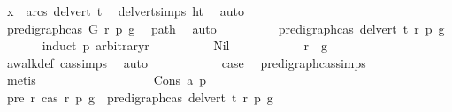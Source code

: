 \begin{isabellebody}
\ {\isachardoublequoteopen}x\ {\isasymin}\ arcs\ {\isacharparenleft}{\kern0pt}del{\isacharunderscore}{\kern0pt}vert\ t{\isacharparenright}{\kern0pt}{\isachardoublequoteclose}\ \isamarkupfalse%
\ del{\isacharunderscore}{\kern0pt}vert{\isacharunderscore}{\kern0pt}simps{\isacharparenleft}{\kern0pt}{}{\isacharparenright}{\kern0pt}\ ht\ \isamarkupfalse%
\ auto\ \ \ \isanewline
\ \ \ \ \isamarkupfalse%
\isanewline
\ \ \ \ \ \ \isamarkupfalse%
\ {\isachardoublequoteopen}pre{\isacharunderscore}{\kern0pt}digraph{\isachardot}{\kern0pt}cas\ G\ r\ p\ g{\isachardoublequoteclose}\ \isamarkupfalse%
\ path\ \isamarkupfalse%
\ auto\isanewline
\ \ \ \ \ \ \isamarkupfalse%
\ \isamarkupfalse%
\ {\isachardoublequoteopen}pre{\isacharunderscore}{\kern0pt}digraph{\isachardot}{\kern0pt}cas\ {\isacharparenleft}{\kern0pt}del{\isacharunderscore}{\kern0pt}vert\ t{\isacharparenright}{\kern0pt}\ r\ p\ g{\isachardoublequoteclose}\isanewline
\ \ \ \ \ \ \isamarkupfalse%
{\isacharparenleft}{\kern0pt}induct\ p\ arbitrary{\isacharcolon}{\kern0pt}r{\isacharparenright}{\kern0pt}\isanewline
\ \ \ \ \ \ \ \ \isamarkupfalse%
\ Nil\isanewline
\ \ \ \ \ \ \ \ \isamarkupfalse%
\ \isamarkupfalse%
\ {\isachardoublequoteopen}r\ {\isacharequal}{\kern0pt}\ g{\isachardoublequoteclose}\ \isamarkupfalse%
\ awalk{\isacharunderscore}{\kern0pt}def\ cas{\isachardot}{\kern0pt}simps\ \isamarkupfalse%
\ auto\isanewline
\ \ \ \ \ \ \ \ \isamarkupfalse%
\ \isamarkupfalse%
\ {\isacharquery}{\kern0pt}case\ \isamarkupfalse%
\ pre{\isacharunderscore}{\kern0pt}digraph{\isachardot}{\kern0pt}cas{\isachardot}{\kern0pt}simps{\isacharparenleft}{\kern0pt}{}{\isacharparenright}{\kern0pt}\isanewline
\ \ \ \ \ \ \ \ \ \ \isamarkupfalse%
\ {\isacharparenleft}{\kern0pt}metis{\isacharparenright}{\kern0pt}\ \ \isanewline
\ \ \ \ \ \ \isamarkupfalse%
\isanewline
\ \ \ \ \ \ \ \ \isamarkupfalse%
\ {\isacharparenleft}{\kern0pt}Cons\ a\ p{\isacharparenright}{\kern0pt}\isanewline
\ \ \ \ \ \ \ \ \isamarkupfalse%
\ pre{\isacharcolon}{\kern0pt}\ {\isachardoublequoteopen}{\isasymAnd}r{\isachardot}{\kern0pt}\ {\isacharparenleft}{\kern0pt}cas\ r\ p\ g\ {\isasymLongrightarrow}\ pre{\isacharunderscore}{\kern0pt}digraph{\isachardot}{\kern0pt}cas\ {\isacharparenleft}{\kern0pt}del{\isacharunderscore}{\kern0pt}vert\ t{\isacharparenright}{\kern0pt}\ r\ p\ g{\isacharparenright}{\kern0pt}{\isachardoublequoteclose}\isanewline

\end{isabellebody}
